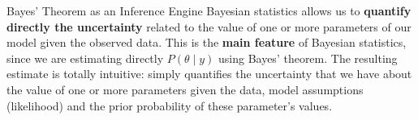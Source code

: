 \begin{frame}{Bayes' Theorem as an Inference Engine}
	Bayesian statistics allows us to \textbf{quantify directly the uncertainty} related to the value of one or more parameters of our model given the observed data.
	This is the \textbf{main feature} of Bayesian statistics, since we are estimating directly $P(\theta \mid y)$ using Bayes' theorem.
	The resulting estimate is totally intuitive: simply quantifies the uncertainty that we have about the value of one or more parameters given the data, model assumptions (likelihood) and the prior probability of these parameter's values.
\end{frame}

